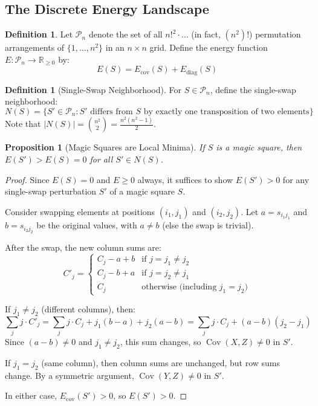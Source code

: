 \documentclass[11pt]{article}
\newtheorem{proposition}[theorem]{Proposition}
\theoremstyle{definition}
\newtheorem{definition}[theorem]{Definition}
\theoremstyle{remark}
\begin{document}
\subsection{The Discrete Energy Landscape}

\begin{definition}
Let $\mathcal{P}_n$ denote the set of all $n!^2 \cdot \ldots$ (in fact, $(n^2)!$) permutation arrangements of $\{1, \ldots, n^2\}$ in an $n \times n$ grid. Define the energy function $E: \mathcal{P}_n \to \mathbb{R}_{\geq 0}$ by:
\[
E(S) = E_{\text{cov}}(S) + E_{\text{diag}}(S)
\]
\end{definition}

\begin{definition}[Single-Swap Neighborhood]
For $S \in \mathcal{P}_n$, define the single-swap neighborhood:
\[
N(S) = \{ S' \in \mathcal{P}_n : S' \text{ differs from } S \text{ by exactly one transposition of two elements} \}
\]
Note that $|N(S)| = \binom{n^2}{2} = \frac{n^2(n^2-1)}{2}$.
\end{definition}

\begin{proposition}[Magic Squares are Local Minima]\label{prop:local-min}
If $S$ is a magic square, then $E(S') > E(S) = 0$ for all $S' \in N(S)$.
\end{proposition}

\begin{proof}
Since $E(S) = 0$ and $E \geq 0$ always, it suffices to show $E(S') > 0$ for any single-swap perturbation $S'$ of a magic square $S$.

Consider swapping elements at positions $(i_1, j_1)$ and $(i_2, j_2)$. Let $a = s_{i_1 j_1}$ and $b = s_{i_2 j_2}$ be the original values, with $a \neq b$ (else the swap is trivial).

After the swap, the new column sums are:
\[
C'_j = \begin{cases}
C_j - a + b & \text{if } j = j_1 \neq j_2 \\
C_j - b + a & \text{if } j = j_2 \neq j_1 \\
C_j & \text{otherwise (including } j_1 = j_2 \text{)}
\end{cases}
\]

If $j_1 \neq j_2$ (different columns), then:
\[
\sum_j j \cdot C'_j = \sum_j j \cdot C_j + j_1(b-a) + j_2(a-b) = \sum_j j \cdot C_j + (a-b)(j_2 - j_1)
\]
Since $(a-b) \neq 0$ and $j_1 \neq j_2$, this sum changes, so $\operatorname{Cov}(X, Z) \neq 0$ in $S'$.

If $j_1 = j_2$ (same column), then column sums are unchanged, but row sums change. By a symmetric argument, $\operatorname{Cov}(Y, Z) \neq 0$ in $S'$.

In either case, $E_{\text{cov}}(S') > 0$, so $E(S') > 0$.
\end{proof}
\end{document}
